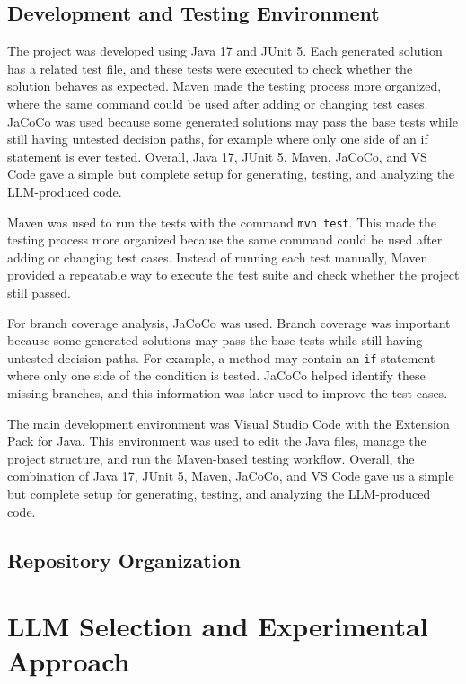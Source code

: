 \documentclass[journal]{IEEEtran}
\begin{document}
\subsection{Development and Testing Environment}

The project was developed using Java 17 and JUnit 5. Each generated solution has a related test file, and these tests were executed to check whether the solution behaves as expected. Maven made the testing process more organized, where the same command could be used after adding or changing test cases. JaCoCo was used because some generated solutions may pass the base tests while still having untested decision paths, for example where only one side of an if statement is ever tested. Overall, Java 17, JUnit 5, Maven, JaCoCo, and VS Code gave a simple but complete setup for generating, testing, and analyzing the LLM-produced code.

Maven was used to run the tests with the command \texttt{mvn test}. This made the testing process more organized because the same command could be used after adding or changing test cases. Instead of running each test manually, Maven provided a repeatable way to execute the test suite and check whether the project still passed.

For branch coverage analysis, JaCoCo was used. Branch coverage was important because some generated solutions may pass the base tests while still having untested decision paths. For example, a method may contain an \texttt{if} statement where only one side of the condition is tested. JaCoCo helped identify these missing branches, and this information was later used to improve the test cases.

The main development environment was Visual Studio Code with the Extension Pack for Java. This environment was used to edit the Java files, manage the project structure, and run the Maven-based testing workflow. Overall, the combination of Java 17, JUnit 5, Maven, JaCoCo, and VS Code gave us a simple but complete setup for generating, testing, and analyzing the LLM-produced code.


\subsection{Repository Organization}


\section{LLM Selection and Experimental Approach}
\end{document}
